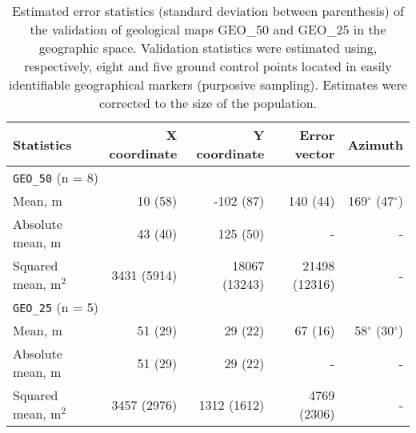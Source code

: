 \begin{table}[ht]
  \caption{Estimated error statistics (standard deviation between parenthesis) of the validation of geological maps GEO\_50 and GEO\_25 in the geographic space. Validation statistics were estimated using, respectively, eight and five ground control points located in easily identifiable geographical markers (purposive sampling). Estimates were corrected to the size of the population.}
  \label{tab:geology-geo-val}
  \centering
  {\small
  \begin{tabular}{lrrrr}
    \hline
    Statistics           & X coordinate & Y coordinate  & Error vector  & Azimuth                  \\
    \hline
    \multicolumn{5}{l}{\texttt{GEO\_50} (n = 8)}                                                   \\
    \hline
    Mean, m              & 10   (58)    & -102  (87)    & 140   (44)    & 169$^\circ$ (47$^\circ$) \\ 
    Absolute mean, m     & 43   (40)    & 125   (50)    & -             & -                        \\ 
    Squared mean, m$^2$  & 3431 (5914)  & 18067 (13243) & 21498 (12316) & -                        \\
    \hline
    \multicolumn{5}{l}{\texttt{GEO\_25} (n = 5)}                                                   \\
    \hline
    Mean, m              & 51    (29)   & 29    (22)    & 67    (16)    & 58$^\circ$  (30$^\circ$) \\ 
    Absolute mean, m     & 51    (29)   & 29    (22)    & -             & -                        \\ 
    Squared mean, m$^2$  & 3457  (2976) & 1312  (1612)  & 4769  (2306)  & -                        \\
    \hline
  \end{tabular}}
\end{table}


